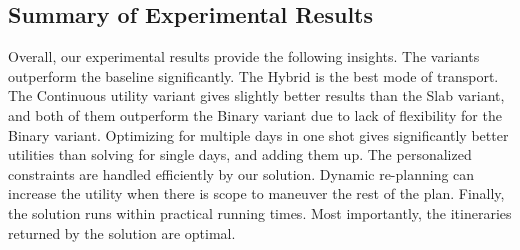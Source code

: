 \subsection{Summary of Experimental Results}

Overall, our experimental results provide the following insights.
The \trip variants outperform the baseline significantly.
The Hybrid is the best mode of transport.
The Continuous utility variant gives slightly better results than the Slab variant, and both of them outperform the Binary variant due to lack of flexibility for the Binary variant.
Optimizing for multiple days in one shot gives significantly better utilities than solving for single days, and adding them up.
The personalized constraints are handled efficiently by our \trip solution.
Dynamic re-planning can increase the utility when there is scope to maneuver the rest of the plan.
Finally, the \trip solution runs within practical running times. Most importantly, the itineraries returned by the \trip solution are optimal.
